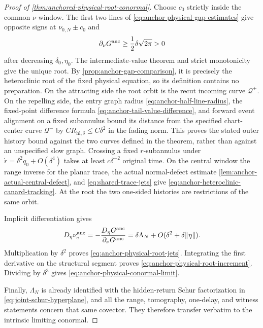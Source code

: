 \begin{proof}[Proof of \cref{thm:anchored-physical-root-conormal}]
Choose \(c_0\) strictly inside the common \(\nu\)-window.  The first two
lines of \cref{eq:anchor-physical-gap-estimates} give opposite signs at
\(\nu_{0,N}\pm c_0\) and
\begin{equation}
 \partial_\nu G^{\rm anc}
 \ge\frac12\delta\sqrt{2\pi}>0                     \label{eq:anchor-physical-parameter-transversality}
\end{equation}
after decreasing \(\delta_0,\eta_0\).  The intermediate-value theorem and
strict monotonicity give the unique root.  By
\cref{prop:anchor-gap-comparison}, it is precisely the heteroclinic root of
the fixed physical equation, so its definition contains no preparation.
  On the attracting side the root orbit is the recut incoming curve
  \(\mathcal Q^+\).  On the repelling side, the entry graph radius
  \cref{eq:anchor-half-line-radius}, the fixed-point difference formula
  \cref{eq:anchor-tail-value-difference}, and forward event alignment on a
  fixed subannulus bound its distance from the specified chart-center curve
  \(\mathcal Q^-\) by
  \(CR_{\mathrm{hl},\delta}\le C\delta^2\) in the fading norm.  This
  proves the stated outer history bound against the two curves defined in the
  theorem, rather than against an unspecified slow graph.  Crossing a fixed \(r\)-subannulus under
\(\dot r=\delta^2q_0+O(\delta^4)\) takes at least
\(c\delta^{-2}\) original time.  On the central window the range inverse
for the planar trace, the actual normal-defect estimate
\cref{lem:anchor-actual-central-defect}, and
\cref{eq:shared-trace-jets} give
\cref{eq:anchor-heteroclinic-canard-tracking}.  At the root the two
one-sided histories are restrictions of the same orbit.

Implicit differentiation gives
\begin{equation}
 D_\eta\nu_c^{\rm anc}
 =-\frac{D_\eta G^{\rm anc}}
          {\partial_\nu G^{\rm anc}}
 =\delta\Lambda_N+O(\delta^2+\delta\|\eta\|).       \label{eq:anchor-root-implicit-derivative}
\end{equation}
Multiplication by \(\delta^2\) proves
\cref{eq:anchor-physical-root-jets}.  Integrating the first derivative
on the structural segment proves \cref{eq:anchor-physical-root-increment}.
Dividing by \(\delta^3\) gives
\cref{eq:anchor-physical-conormal-limit}.

Finally, \(\Lambda_N\) is already identified with the hidden-return Schur
factorization in \cref{eq:joint-schur-hyperplane}, and all the range,
tomography, one-delay, and witness statements concern that same covector.
They therefore transfer verbatim to the intrinsic limiting conormal.
\end{proof}

